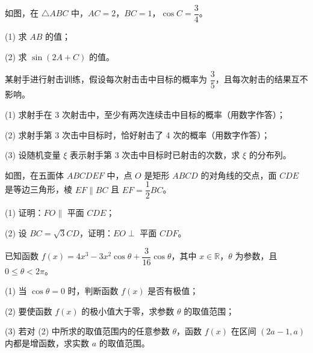 \Needspace{0.4\textheight}
\begin{question}

如图，在 \(\triangle ABC\) 中，\(AC=2\)，\(BC=1\)，\(\cos C=\dfrac34\)。

(1) 求 \(AB\) 的值；

(2) 求 \(\sin(2A+C)\) 的值。
\nopagebreak[4]
\begin{center}\end{center}
\nopagebreak[4]
\end{question}
\begin{question}

某射手进行射击训练，假设每次射击击中目标的概率为 \(\dfrac35\)，且每次射击的结果互不影响。

(1) 求射手在 3 次射击中，至少有两次连续击中目标的概率（用数字作答）；

(2) 求射手第 3 次击中目标时，恰好射击了 4 次的概率（用数字作答）；

(3) 设随机变量 \(\xi\) 表示射手第 3 次击中目标时已射击的次数，求 \(\xi\) 的分布列。

\Needspace{0.4\textheight}
\end{question}
\begin{question}

如图，在五面体 \(ABCDEF\) 中，点 \(O\) 是矩形 \(ABCD\) 的对角线的交点，面 \(CDE\) 是等边三角形，棱 \(EF\parallel BC\) 且 \(EF=\dfrac12BC\)。

(1) 证明：\(FO\parallel\) 平面 \(CDE\)；

(2) 设 \(BC=\sqrt3CD\)，证明：\(EO\perp\) 平面 \(CDF\)。
\nopagebreak[4]
\begin{center}\end{center}
\nopagebreak[4]
\end{question}
\begin{question}

已知函数 \(f(x)=4x^3-3x^2\cos\theta+\dfrac3{16}\cos\theta\)，其中 \(x\in\mathbb R\)，\(\theta\) 为参数，且 \(0\leq\theta<2\pi\)。

(1) 当 \(\cos\theta=0\) 时，判断函数 \(f(x)\) 是否有极值；

(2) 要使函数 \(f(x)\) 的极小值大于零，求参数 \(\theta\) 的取值范围；

(3) 若对 (2) 中所求的取值范围内的任意参数 \(\theta\)，函数 \(f(x)\) 在区间 \((2a-1,a)\) 内都是增函数，求实数 \(a\) 的取值范围。

\end{question}
